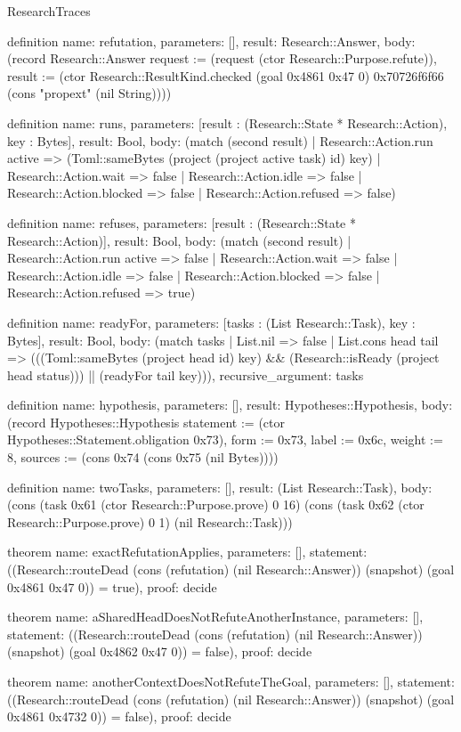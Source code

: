 \begin{lexlean}{ResearchTraces}
\begin{semanticmodule}
definition{
  name: refutation,
  parameters: [],
  result: Research::Answer,
  body: (record Research::Answer {request := (request (ctor Research::Purpose.refute)), result := (ctor Research::ResultKind.checked (goal 0x4861 0x47 0) 0x70726f6f66 (cons "propext" (nil String)))})
}

definition{
  name: runs,
  parameters: [result : (Research::State * Research::Action), key : Bytes],
  result: Bool,
  body: (match (second result)
    | Research::Action.run active => (Toml::sameBytes (project (project active task) id) key)
    | Research::Action.wait => false
    | Research::Action.idle => false
    | Research::Action.blocked => false
    | Research::Action.refused => false)
}

definition{
  name: refuses,
  parameters: [result : (Research::State * Research::Action)],
  result: Bool,
  body: (match (second result)
    | Research::Action.run active => false
    | Research::Action.wait => false
    | Research::Action.idle => false
    | Research::Action.blocked => false
    | Research::Action.refused => true)
}

definition{
  name: readyFor,
  parameters: [tasks : (List Research::Task), key : Bytes],
  result: Bool,
  body: (match tasks
    | List.nil => false
    | List.cons head tail => (((Toml::sameBytes (project head id) key) && (Research::isReady (project head status))) || (readyFor tail key))),
  recursive_argument: tasks
}

definition{
  name: hypothesis,
  parameters: [],
  result: Hypotheses::Hypothesis,
  body: (record Hypotheses::Hypothesis {statement := (ctor Hypotheses::Statement.obligation 0x73), form := 0x73, label := 0x6c, weight := 8, sources := (cons 0x74 (cons 0x75 (nil Bytes)))})
}

definition{
  name: twoTasks,
  parameters: [],
  result: (List Research::Task),
  body: (cons (task 0x61 (ctor Research::Purpose.prove) 0 16) (cons (task 0x62 (ctor Research::Purpose.prove) 0 1) (nil Research::Task)))
}

theorem{
  name: exactRefutationApplies,
  parameters: [],
  statement: ((Research::routeDead (cons (refutation) (nil Research::Answer)) (snapshot) (goal 0x4861 0x47 0)) = true),
  proof: decide{}
}

theorem{
  name: aSharedHeadDoesNotRefuteAnotherInstance,
  parameters: [],
  statement: ((Research::routeDead (cons (refutation) (nil Research::Answer)) (snapshot) (goal 0x4862 0x47 0)) = false),
  proof: decide{}
}

theorem{
  name: anotherContextDoesNotRefuteTheGoal,
  parameters: [],
  statement: ((Research::routeDead (cons (refutation) (nil Research::Answer)) (snapshot) (goal 0x4861 0x4732 0)) = false),
  proof: decide{}
}


\end{semanticmodule}
\end{lexlean}
